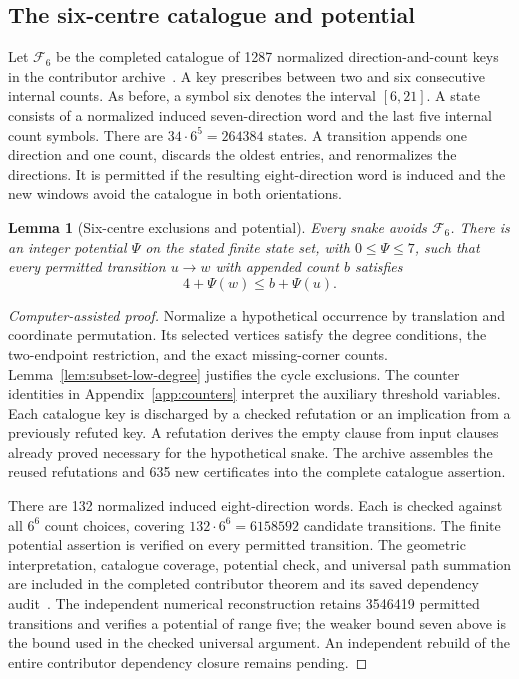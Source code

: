 \documentclass[11pt,a4paper]{article}
\newtheorem{lemma}[theorem]{Lemma}
\theoremstyle{definition}
\theoremstyle{remark}
\begin{document}
\subsection{The six-centre catalogue and potential}\label{sec:six-centre-235}
Let $\mathcal F_6$ be the completed catalogue of 1287 normalized direction-and-count keys in the contributor archive~\cite{bound235archive}. A key prescribes between two and six consecutive internal counts. As before, a symbol six denotes the interval $[6,21]$. A state consists of a normalized induced seven-direction word and the last five internal count symbols. There are $34\cdot6^5=264384$ states. A transition appends one direction and one count, discards the oldest entries, and renormalizes the directions. It is permitted if the resulting eight-direction word is induced and the new windows avoid the catalogue in both orientations.

\begin{lemma}[Six-centre exclusions and potential]\label{lem:six-centre-235}
Every snake avoids $\mathcal F_6$. There is an integer potential $\Psi$ on the stated finite state set, with $0\le\Psi\le7$, such that every permitted transition $u\to w$ with appended count $b$ satisfies
\begin{equation}\label{eq:six-centre-step}
4+\Psi(w)\le b+\Psi(u).
\end{equation}
\end{lemma}
\begin{proof}[Computer-assisted proof]
Normalize a hypothetical occurrence by translation and coordinate permutation. Its selected vertices satisfy the degree conditions, the two-endpoint restriction, and the exact missing-corner counts. Lemma~\ref{lem:subset-low-degree} justifies the cycle exclusions. The counter identities in Appendix~\ref{app:counters} interpret the auxiliary threshold variables. Each catalogue key is discharged by a checked refutation or an implication from a previously refuted key. A refutation derives the empty clause from input clauses already proved necessary for the hypothetical snake. The archive assembles the reused refutations and 635 new certificates into the complete catalogue assertion.

There are 132 normalized induced eight-direction words. Each is checked against all $6^6$ count choices, covering $132\cdot6^6=6158592$ candidate transitions. The finite potential assertion is verified on every permitted transition. The geometric interpretation, catalogue coverage, potential check, and universal path summation are included in the completed contributor theorem and its saved dependency audit~\cite{bound235archive}. The independent numerical reconstruction retains 3546419 permitted transitions and verifies a potential of range five; the weaker bound seven above is the bound used in the checked universal argument. An independent rebuild of the entire contributor dependency closure remains pending.
\end{proof}
\end{document}
